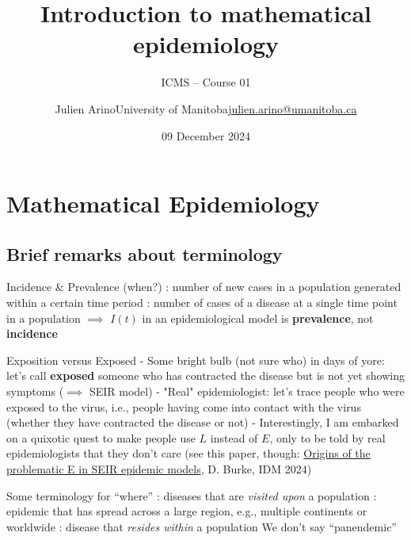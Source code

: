 \documentclass[aspectratio=169]{beamer}\usepackage[]{graphicx}\usepackage[]{xcolor}
\title{Introduction to mathematical epidemiology}
\subtitle{ICMS -- Course 01}
\date{09 December 2024}
\author{\texorpdfstring{Julien Arino\newline University of Manitoba\newline\url{julien.arino@umanitoba.ca}}{Julien Arino}}
\begin{document}


\section{Mathematical Epidemiology}

\subsection{Brief remarks about terminology}


\begin{frame}{Incidence \& Prevalence (when?)}
: number of new cases in a population generated within a certain time period
\vfill
{}: number of cases of a disease at a single time point in a population
\vfill
$\implies$ $I(t)$ in an epidemiological model is \textbf{prevalence}, not \textbf{incidence}
\end{frame}

\begin{frame}{Exposition versus Exposed}
- Some bright bulb (not sure who) in days of yore: let's call \textbf{exposed} someone who has contracted the disease but is not yet showing symptoms ($\implies$ SEIR model)
\vfill
- "Real" epidemiologist: let's trace people who were exposed to the virus, i.e., people having come into contact with the virus (whether they have contracted the disease or not)
\vfill
- Interestingly, I am embarked on a quixotic quest to make people use $L$ instead of $E$, only to be told by real epidemiologists that they don't care \code{:)} (see this paper, though: \href{https://doi.org/10.1016/j.idm.2024.03.003}{Origins of the problematic E in SEIR epidemic models}, D. Burke, IDM 2024)
\end{frame}




\begin{frame}{Some terminology for ``where''}
\bbullet {}: diseases that are \emph{visited upon} a population
\vfill
\bbullet {}: epidemic that has spread across a large region, e.g., multiple continents or worldwide
\vfill
\bbullet {}: disease that \emph{resides within} a population
\vfill
\bbullet We don't say ``panendemic''
\end{frame}
\end{document}
